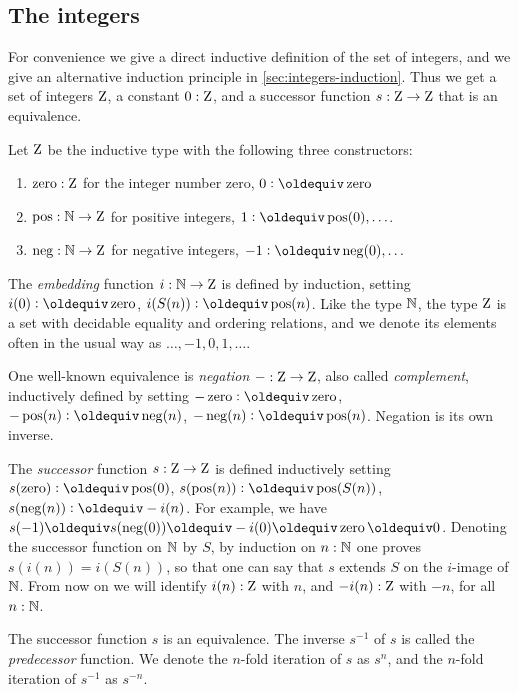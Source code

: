 \documentclass[a4paper,12pt]{amsart}
\begin{document}
\subsection{The integers}
\label{sec:integers}

For convenience we give a direct inductive
definition of the set of integers, and we give
an alternative induction principle in \cref{sec:integers-induction}.
Thus we get a set of integers $\mathrm{Z}$, a constant $0:\mathrm{Z}$,
and a successor function $s:\mathrm{Z}\to\mathrm{Z}$
that is an equivalence.

\begin{definition}\label{def:integers}
Let $\mathrm{Z}$ be the inductive type with the following three constructors:
\begin{enumerate}[topsep=0pt]
\item $\mathop{\mathrm{zero}}: \mathrm{Z}$ for the integer number zero,
$0 \defeq \zzero$
\item $\mathop{\mathrm{pos}}: \mathbb{N} \to \mathrm{Z}$ for positive {integers},
$1 \defeq \zpos(0),\ldots$.
\item $\mathop{\mathrm{neg}}: \mathbb{N} \to \mathrm{Z}$ for negative {integers},
$-1 \defeq \zneg(0),\ldots$
\end{enumerate}
\end{definition}

The \emph{embedding} function $i:\mathbb{N}\to\mathrm{Z}$ is defined by induction,
setting $i(0)\defeq \zzero$, $i(S(n))\defeq \zpos(n)$.
Like the type $\mathbb{N}$, the type $\mathrm{Z}$ is a set with decidable equality
and ordering relations,
and we denote its elements often in the usual way as $\ldots,-1,0,1,\ldots$.

One well-known equivalence is \emph{negation} ${-}:\mathrm{Z}\to\mathrm{Z}$,
also called \emph{complement}, inductively defined by setting
$-\zzero\defeq \zzero$,
$-\zpos(n)\defeq \zneg(n)$,
$-\zneg(n)\defeq \zpos(n)$.
Negation is its own inverse.

The \emph{successor} function $s:\mathrm{Z}\to\mathrm{Z}$ is defined inductively setting
$s(\zzero)\defeq \zpos(0)$,
$s(\zpos(n))\defeq \zpos(S(n))$,
$s(\zneg(n))\defeq -i(n)$. For example, we have
$s(-1)\jdeq s(\zneg(0))\jdeq -i(0) \jdeq \zzero \jdeq 0$.
{Denoting the successor function on $\mathbb{N}$ by $S$,
by} induction on $n:\mathbb{N}$ one proves $s(i(n))=i(S(n))$,
so that one can say that $s$ extends $S$ on the $i$-image of $\mathbb{N}$.
From now on we will identify $i(n):\mathrm{Z}$ with $n$,
and $-i(n):\mathrm{Z}$ with $-n$, for all $n:\mathbb{N}$.

The successor function $s$ is an equivalence.
The inverse $s^{-1}$ of $s$ is called the \emph{predecessor} function.
We denote the $n$-fold iteration of $s$ as $s^n$, and
the $n$-fold iteration of $s^{-1}$ as $s^{-n}$.
\end{document}
